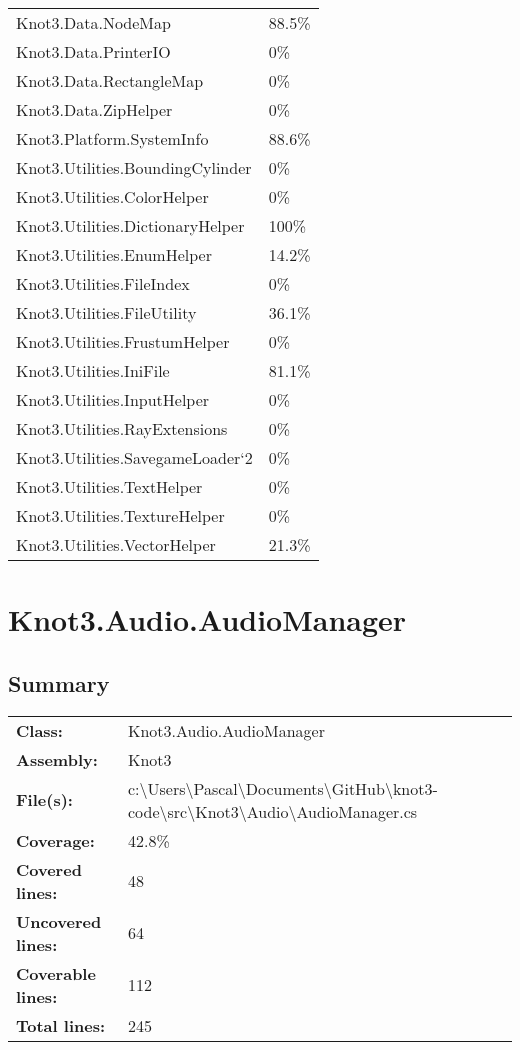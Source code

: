 \documentclass[a4paper,10pt]{article}
\begin{document}
\begin{longtable}[l]{ll}
Knot3.Data.NodeMap & 88.5\%\\
Knot3.Data.PrinterIO & 0\%\\
Knot3.Data.RectangleMap & 0\%\\
Knot3.Data.ZipHelper & 0\%\\
Knot3.Platform.SystemInfo & 88.6\%\\
Knot3.Utilities.BoundingCylinder & 0\%\\
Knot3.Utilities.ColorHelper & 0\%\\
Knot3.Utilities.DictionaryHelper & 100\%\\
Knot3.Utilities.EnumHelper & 14.2\%\\
Knot3.Utilities.FileIndex & 0\%\\
Knot3.Utilities.FileUtility & 36.1\%\\
Knot3.Utilities.FrustumHelper & 0\%\\
Knot3.Utilities.IniFile & 81.1\%\\
Knot3.Utilities.InputHelper & 0\%\\
Knot3.Utilities.RayExtensions & 0\%\\
Knot3.Utilities.SavegameLoader`2 & 0\%\\
Knot3.Utilities.TextHelper & 0\%\\
Knot3.Utilities.TextureHelper & 0\%\\
Knot3.Utilities.VectorHelper & 21.3\%\\
\end{longtable}
\newpage
\section{Knot3.Audio.AudioManager}
\subsection{Summary}
\begin{longtable}[l]{ll}
\textbf{Class:} & Knot3.Audio.AudioManager\\
\textbf{Assembly:} & Knot3\\
\textbf{File(s):} & \begin{minipage}[t]{12cm}{c:\textbackslash Users\textbackslash Pascal\textbackslash Documents\textbackslash GitHub\textbackslash knot3-code\textbackslash src\textbackslash Knot3\textbackslash Audio\textbackslash AudioManager.cs}\end{minipage} \\
\textbf{Coverage:} & 42.8\%\\
\textbf{Covered lines:} & 48\\
\textbf{Uncovered lines:} & 64\\
\textbf{Coverable lines:} & 112\\
\textbf{Total lines:} & 245\\
\end{longtable}
\end{document}
